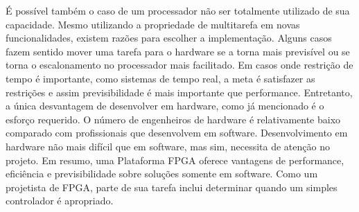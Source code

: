 É possível também o caso de um processador não ser totalmente utilizado de sua capacidade. Mesmo utilizando a propriedade de multitarefa em novas funcionalidades, existem razões para escolher a implementação. Alguns casos fazem sentido mover uma tarefa para o hardware se a torna mais previsível ou se torna o escalonamento no processador mais facilitado. Em casos onde restrição de tempo é importante, como sistemas de tempo real, a meta é satisfazer as restrições e assim previsibilidade é mais importante que performance. Entretanto, a única desvantagem de desenvolver em hardware, como já mencionado é o esforço requerido. O número de engenheiros de hardware é relativamente baixo comparado com profissionais que desenvolvem em software. Desenvolvimento em hardware não mais difícil que em software, mas sim, necessita de atenção no projeto. Em resumo, uma Plataforma FPGA oferece vantagens de performance, eficiência e previsibilidade sobre soluções somente em software. Como um projetista de FPGA, parte de sua tarefa inclui determinar quando um simples controlador é apropriado.


